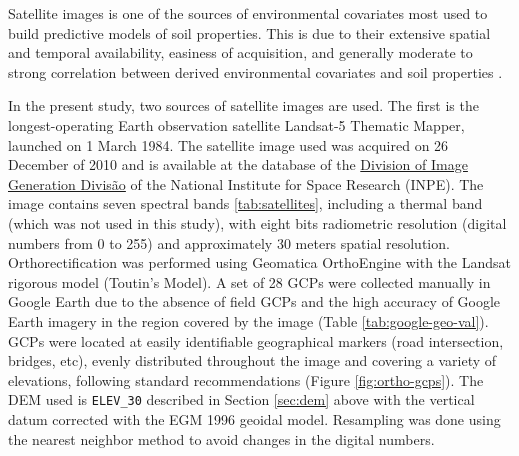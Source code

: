 Satellite images is one of the sources of environmental covariates most used to build predictive models of soil properties. This is due to their extensive spatial and temporal availability, easiness of acquisition, and generally moderate to strong correlation between derived environmental covariates and soil properties \cite{BishopEtAl2001, Grunwald2009}.

In the present study, two sources of satellite images are used. The first is the longest-operating Earth observation satellite Landsat-5 Thematic Mapper, launched on 1 March 1984. The satellite image used was acquired on 26 December of 2010 and is available at the database of the \href{http://www.dgi.inpe.br/CDSR/}{Division of Image Generation Divisão} of the National Institute for Space Research (INPE). The image contains seven spectral bands \ref{tab:satellites}, including a thermal band (which was not used in this study), with eight bits radiometric resolution (digital numbers from 0 to 255) and approximately 30 meters spatial resolution. Orthorectification was performed using Geomatica\textregistered{} OrthoEngine\textregistered{} with the Landsat rigorous model (Toutin's Model). A set of 28 GCPs were collected manually in Google Earth\textregistered{} due to the absence of field GCPs and the high accuracy of Google Earth\textregistered{} imagery in the region covered by the image (Table \ref{tab:google-geo-val}). GCPs were located at easily identifiable geographical markers (road intersection, bridges, etc), evenly distributed throughout the image and covering a variety of elevations, following standard recommendations \cite{PCIGeomatics2007} (Figure \ref{fig:ortho-gcps}). The DEM used is \texttt{ELEV\_30} described in Section \ref{sec:dem} above with the vertical datum corrected with the EGM 1996 geoidal model. Resampling was done using the nearest neighbor method to avoid changes in the digital numbers.


